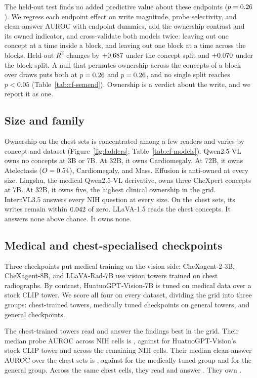 The held-out test finds no added predictive value about these endpoints ($p=0.26$). We regress each endpoint effect on write magnitude, probe selectivity, and clean-answer AUROC with endpoint dummies, add the ownership contrast and its owned indicator, and cross-validate both models twice: leaving out one concept at a time inside a block, and leaving out one block at a time across the \cfSemCvBlocks{} blocks. Held-out $R^2$ changes by $+0.687$ under the concept split and $+0.070$ under the block split. A null that permutes ownership across the concepts of a block over \cfSemCvPerms{} draws puts both at $p=0.26$ and $p=0.26$, and no single split reaches $p<0.05$ (Table~\ref{tab:cf-semend}). Ownership is a verdict about the write, and we report it as one.

\subsection{Size and family}
\label{sec:families}

Ownership on the chest sets is concentrated among a few readers and varies by concept and dataset (Figure~\ref{fig:ladders}; Table~\ref{tab:cf-models}). Qwen2.5-VL owns no concepts at 3B or 7B. At 32B, it owns Cardiomegaly. At 72B, it owns Atelectasis ($O=0.54$), Cardiomegaly, and Mass. Effusion is anti-owned at every size. Lingshu, the medical Qwen2.5-VL derivative, owns three CheXpert concepts at 7B. At 32B, it owns five, the highest clinical ownership in the grid. InternVL3.5 answers every NIH question at every size. On the chest sets, its writes remain within $0.042$ of zero. LLaVA-1.5 reads the chest concepts. It answers none above chance. It owns none.

\subsection{Medical and chest-specialised checkpoints}
\label{sec:specialisation}

Three checkpoints put medical training on the vision side: CheXagent-2-3B, CheXagent-8B, and LLaVA-Rad-7B use vision towers trained on chest radiographs. By contrast, HuatuoGPT-Vision-7B is tuned on medical data over a stock CLIP tower. We score all four on every dataset, dividing the grid into three groups: chest-trained towers, medically tuned checkpoints on general towers, and general checkpoints.

The chest-trained towers read and answer the findings best in the grid. Their median probe AUROC across \cfSpecTowerProbeN{} NIH cells is \cfSpecTowerProbeAuroc{}, against \cfSpecStockProbeAuroc{} for HuatuoGPT-Vision's stock CLIP tower and \cfSpecRestProbeAuroc{} across the \cfSpecRestProbeN{} remaining NIH cells. Their median clean-answer AUROC over the chest sets is \cfSpecTowerAnsAuroc{}, against \cfSpecMedAnsAuroc{} for the medically tuned group and \cfSpecGenAnsAuroc{} for the general group. Across the same \cfSpecTowerN{} chest cells, they read \cfSpecTowerReadable{} and answer \cfSpecTowerAnswerable{}. They own \cfSpecTowerOwned{}.

